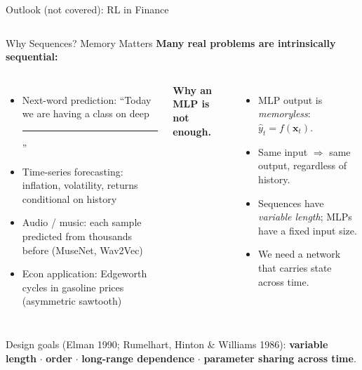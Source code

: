 \documentclass[aspectratio=169,11pt]{beamer}
\newcommand{\emphc}[1]{\textcolor{harvardcrimson}{#1}}
\newcommand{\x}{\bm{x}}
\begin{document}
\begin{frame}{Outlook (not covered): RL in Finance}
\begin{columns}[T]
\begin{center}
\end{center}
\end{columns}
\end{frame}


\begin{frame}{Why Sequences? Memory Matters}
\footnotesize
\textbf{Many real problems are intrinsically sequential:}
\begin{columns}[T]
\begin{itemize}\itemsep1pt
    \item \emphc{Next-word prediction:} ``Today we are having a class on deep \rule{0.9cm}{0.4pt}''
    \item \emphc{Time-series forecasting:} inflation, volatility, returns conditional on history
    \item \emphc{Audio / music:} each sample predicted from thousands before (MuseNet, Wav2Vec)
    \item \emphc{Econ application:} Edgeworth cycles in gasoline prices (asymmetric sawtooth)
\end{itemize}

\textbf{Why an MLP is not enough.}
\begin{itemize}\itemsep1pt
    \item MLP output is \emph{memoryless}: $\hat{y}_t = f(\x_t)$.
    \item Same input $\Rightarrow$ same output, regardless of history.
    \item Sequences have \emph{variable length}; MLPs have a fixed input size.
    \item We need a network that \emphc{carries state across time}.
\end{itemize}
\end{columns}

\vspace{5pt}
\begin{center}
\small
\emphc{Design goals} (Elman 1990; Rumelhart, Hinton \& Williams 1986): \textbf{variable length} $\cdot$ \textbf{order} $\cdot$ \textbf{long-range dependence} $\cdot$ \textbf{parameter sharing across time}.
\end{center}
\end{frame}
\end{document}
